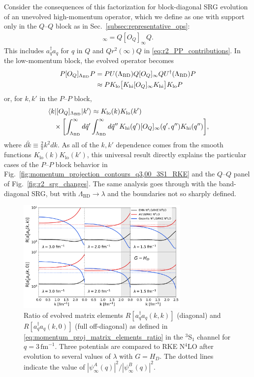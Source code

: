 \documentclass[10pt,aps,prc,floatfix,twocolumn,nofootinbib]{revtex4-1}
\newcommand{\LambdaBD}{{\Lambda_{\text{BD}}}}
\newcommand{\ataq}{a^{\dagger}_q a_q}
\newcommand{\Klo}{K_{\text{lo}}}
\newcommand{\Khi}{K_{\text{hi}}}
\newcommand{\PP}{\ensuremath{P\mbox{--}P}}
\newcommand{\QQ}{\ensuremath{Q\mbox{--}Q}}
\begin{document}
Consider the consequences of this factorization for block-diagonal SRG evolution of an unevolved high-momentum operator, which we define as one with support only in the $\QQ$ block as in Sec.~\ref{subsec:representative_ops}:
%
\begin{align}
    [O_Q]_\infty = Q [O_Q]_\infty Q.
\end{align}
%
This includes $\ataq$ for $q$ in $Q$ and $Qr^2(\infty)Q$ in \eqref{eq:r2_PP_contributions}.
In the low-momentum block, the evolved operator becomes
%
\begin{align}
    P [O_Q]_\LambdaBD P &=
      P U(\LambdaBD)Q[O_Q]_\infty Q U^\dagger(\LambdaBD) P \notag \\
      &\approx P \Klo \bigl[\Khi [O_Q]_\infty \Khi\bigr] \Klo P
\end{align}
%
or, for $k,k'$ in the $\PP$ block,
%
\begin{align} \label{eq:factored_op}
   & \mel{k}{[O_Q]_\LambdaBD}{k'} \approx 
        \Klo(k) \Klo(k') \notag \\
  &  \quad \times
     \biggl[
      \int_{\LambdaBD}^{\infty} d\tilde{q}' 
      \int_{\LambdaBD}^{\infty} d\tilde{q}''\, \Khi(q') [O_Q]_\infty(q',q'') \Khi(q'')
     \biggr],
\end{align}
%
where $d\tilde{k} \equiv \frac{2}{\pi} k^2 dk$.
As all of the $k,k'$ dependence comes from the smooth functions $\Klo(k)\Klo(k')$, this universal result directly explains the particular cases of the $\PP$ block behavior in Fig.~\ref{fig:momentum_projection_contours_q3,00_3S1_RKE} and the $\QQ$ panel of Fig.~\ref{fig:r2_srg_changes}. 
The same analysis goes through with the band-diagonal SRG, but with $\LambdaBD \rightarrow \lambda$ and the boundaries not so sharply defined.

%
\begin{figure}[tbh]
	\includegraphics[clip,width=0.75\textwidth]{momentum_projection_ratios_q3,00_3S1_Wegner_kvnns_111_79_6_222.pdf}%
	\caption{Ratio of evolved matrix elements $R[\ataq(k,k)]$ (diagonal) and $R[\ataq(k,0)]$ (full off-diagonal) as defined in \eqref{eq:momentum_proj_matrix_elements_ratio} in the $^3$S$_1$ channel for $q = 3\,\mbox{fm}^{-1}$.
	Three potentials are compared to RKE N$^4$LO after evolution to several values of $\lambda$ with $G = H_D$.
	The dotted lines indicate the value of $|\psi^A_{\infty}(q)|^2 / |\psi^B_{\infty}(q)|^2$.}
	\label{fig:R_ratio_comparison}
\end{figure}
%
\end{document}
